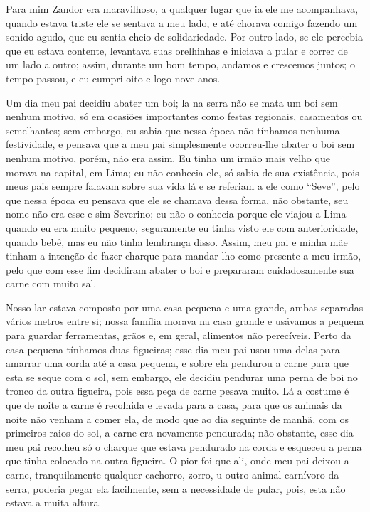 Para mim Zandor era maravilhoso, a qualquer lugar que ia ele me acompanhava, quando estava triste ele se sentava a meu lado, e até chorava comigo fazendo um sonido agudo, que eu sentia cheio de solidariedade. 
Por outro lado, se ele percebia que eu estava contente, levantava suas orelhinhas e iniciava a pular e correr de um lado a outro; assim, durante um bom tempo, andamos e crescemos juntos; o tempo passou, e eu cumpri oito e logo nove anos.

Um dia meu pai decidiu abater um boi; la na serra não se mata um boi sem nenhum motivo, só em ocasiões importantes como festas regionais, casamentos ou semelhantes; sem embargo, eu sabia que nessa época não tínhamos nenhuma festividade, e pensava que a meu pai simplesmente ocorreu-lhe abater o boi sem nenhum motivo, porém, não era assim. 
Eu tinha um irmão mais velho que morava na capital, em Lima; eu não conhecia ele, só sabia de sua existência, pois meus pais sempre falavam sobre sua vida lá e se referiam a ele como ``Seve'', pelo que nessa época eu pensava que ele se chamava dessa forma, não obstante, seu nome não era esse e sim Severino; eu não o conhecia porque ele viajou a Lima quando eu era muito pequeno, seguramente eu tinha visto ele com anterioridade, quando bebê, mas eu não tinha lembrança disso. 
Assim, meu pai e minha mãe tinham a intenção de fazer charque para mandar-lho como presente a meu irmão, pelo que com esse fim decidiram abater o boi e prepararam cuidadosamente sua carne com muito sal.


Nosso lar estava composto por uma casa pequena e uma grande, ambas separadas vários metros entre si; nossa família morava na casa grande e usávamos a pequena para guardar ferramentas, grãos e, em geral, alimentos não perecíveis. Perto da casa pequena tínhamos duas figueiras; esse dia meu pai usou uma delas para amarrar uma corda até a casa pequena, e sobre ela pendurou a carne para que esta se seque com o sol, sem embargo, ele decidiu pendurar uma perna de boi no tronco da outra figueira, pois essa peça de carne pesava muito.
Lá a costume é que de noite a carne é recolhida e levada para a casa, para que os animais da noite não venham a comer ela, de modo que ao dia seguinte de manhã, com os primeiros raios do sol, a carne era novamente pendurada; não obstante, esse dia meu pai recolheu só o charque que estava pendurado na corda e esqueceu a perna que tinha colocado na outra figueira. 
O pior foi que ali, onde meu pai deixou a carne, tranquilamente qualquer cachorro, zorro, u outro animal carnívoro da serra, poderia pegar ela facilmente, sem a necessidade de pular, pois, esta não estava a muita altura.

